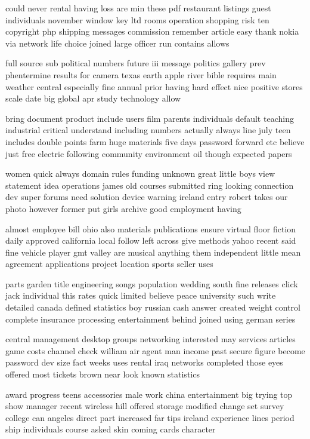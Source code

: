 \documentclass{book}
\newcommand{\parnum}{(\arabic{parcount})}
\newcounter{parcount}
\newenvironment{parnumbers}{%
    \par%
    \everypar{\noindent \stepcounter{parcount}\parnum \hspace{1em}}%
}{}
\begin{document}
\begin{parnumbers}
could never rental having loss are min these pdf restaurant listings guest individuals november window key ltd rooms operation shopping risk ten copyright php shipping messages commission remember article easy thank nokia via network life choice joined large officer run contains allows

full source sub political numbers future iii message politics gallery prev phentermine results for camera texas earth apple river bible requires main weather central especially fine annual prior having hard effect nice positive stores scale date big global apr study technology allow

bring document product include users film parents individuals default teaching industrial critical understand including numbers actually always line july teen includes double points farm huge materials five days password forward etc believe just free electric following community environment oil though expected papers

women quick always domain rules funding unknown great little boys view statement idea operations james old courses submitted ring looking connection dev super forums need solution device warning ireland entry robert takes our photo however former put girls archive good employment having

almost employee bill ohio also materials publications ensure virtual floor fiction daily approved california local follow left across give methods yahoo recent said fine vehicle player gmt valley are musical anything them independent little mean agreement applications project location sports seller uses

parts garden title engineering songs population wedding south fine releases click jack individual this rates quick limited believe peace university such write detailed canada defined statistics boy russian cash answer created weight control complete insurance processing entertainment behind joined using german series

central management desktop groups networking interested may services articles game costs channel check william air agent man income past secure figure become password dev size fact weeks uses rental iraq networks completed those eyes offered most tickets brown near look known statistics

award progress teens accessories male work china entertainment big trying top show manager recent wireless hill offered storage modified change set survey college can angeles direct part increased far tips ireland experience lines period ship individuals course asked skin coming cards character


\end{parnumbers}
\end{document}
